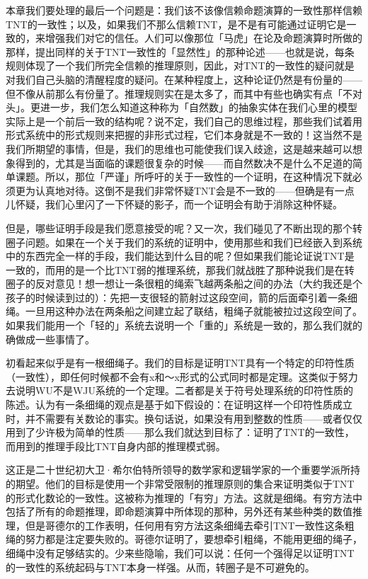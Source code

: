 \documentclass[
  12pt,
  twoside,
  openright,
  oldfontcommands,
]{memoir}
\begin{document}
本章我们要处理的最后一个问题是：我们该不该像信赖命题演算的一致性那样信赖TNT的一致性；以及，如果我们不那么信赖TNT，是不是有可能通过证明它是一致的，来增强我们对它的信任。人们可以像那位「马虎」在论及命题演算时所做的那样，提出同样的关于TNT一致性的「显然性」的那种论述------也就是说，每条规则体现了一个我们所完全信赖的推理原则，因此，对TNT的一致性的疑问就是对我们自己头脑的清醒程度的疑问。在某种程度上，这种论证仍然是有份量的------但不像从前那么有份量了。推理规则实在是太多了，而其中有些也确实有点「不对头」。更进一步，我们怎么知道这种称为「自然数」的抽象实体在我们心里的模型实际上是一个前后一致的结构呢？说不定，我们自己的思维过程，那些我们试着用形式系统中的形式规则来把握的非形式过程，它们本身就是不一致的！这当然不是我们所期望的事情，但是，我们的思维也可能使我们误入歧途，这是越来越可以想象得到的，尤其是当面临的课题很复杂的时候------而自然数决不是什么不足道的简单课题。所以，那位「严谨」所呼吁的关于一致性的一个证明，在这种情况下就必须更为认真地对待。这倒不是我们非常怀疑TNT会是不一致的------但确是有一点儿怀疑，我们心里闪了一下怀疑的影子，而一个证明会有助于消除这种怀疑。

但是，哪些证明手段是我们愿意接受的呢？又一次，我们碰见了不断出现的那个转圈子问题。如果在一个关于我们的系统的证明中，使用那些和我们已经嵌入到系统中的东西完全一样的手段，我们能达到什么目的呢？但如果我们能论证说TNT是一致的，而用的是一个比TNT弱的推理系统，那我们就战胜了那种说我们是在转圈子的反对意见！想一想让一条很粗的绳索飞越两条船之间的办法（大约我还是个孩子的时候读到过的）：先把一支很轻的箭射过这段空间，箭的后面牵引着一条细绳。一旦用这种办法在两条船之间建立起了联结，粗绳子就能被拉过这段空间了。如果我们能用一个「轻的」系统去说明一个「重的」系统是一致的，那么我们就的确做成一些事情了。

初看起来似乎是有一根细绳子。我们的目标是证明TNT具有一个特定的印符性质（一致性），即任何时候都不会有x和～x形式的公式同时都是定理。这类似于努力去说明WU不是WJU系统的一个定理。二者都是关于符号处理系统的印符性质的陈述。认为有一条细绳的观点是基于如下假设的：在证明这样一个印符性质成立时，并不需要有关数论的事实。换句话说，如果没有用到整数的性质------或者仅仅用到了少许极为简单的性质------那么我们就达到目标了：证明了TNT的一致性，而用到的推理手段比TNT自身内部的推理模式弱。

这正是二十世纪初大卫·希尔伯特所领导的数学家和逻辑学家的一个重要学派所持的期望。他们的目标是使用一个非常受限制的推理原则的集合来证明类似于TNT的形式化数论的一致性。这被称为推理的「有穷」方法。这就是细绳。有穷方法中包括了所有的命题推理，即命题演算中所体现的那种，另外还有某些种类的数值推理，但是哥德尔的工作表明，任何用有穷方法这条细绳去牵引TNT一致性这条粗绳的努力都是注定要失败的。哥德尔证明了，要想牵引粗绳，不能用更细的绳子，细绳中没有足够结实的。少来些隐喻，我们可以说：任何一个强得足以证明TNT的一致性的系统起码与TNT本身一样强。从而，转圈子是不可避免的。
\end{document}
